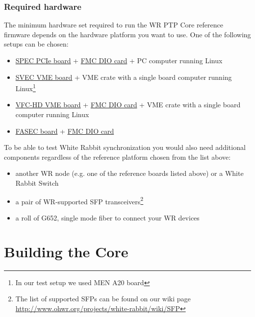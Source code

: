 \documentclass[a4paper, 12pt]{article}
\renewcommand{\_}{\underscore\allowbreak}
\begin{document}
\subsubsection{Required hardware}
\label{Required hardware}

The minimum hardware set required to run the WR PTP Core reference firmware
depends on the hardware platform you want to use. One of the following setups
can be chosen:
\begin{itemize}
\item \href{http://www.ohwr.org/projects/spec}{SPEC PCIe board} +
  \href{http://www.ohwr.org/projects/fmc-dio-5chttla}{FMC DIO card} + PC
  computer running Linux
\item \href{http://www.ohwr.org/projects/svec}{SVEC VME board} + VME crate with
  a single board computer running Linux\footnote{\label{note_a20}In our test setup
    we used MEN A20 board}
\item \href{http://www.ohwr.org/projects/vfc-hd}{VFC-HD VME board} +
  \href{http://www.ohwr.org/projects/fmc-dio-5chttla}{FMC DIO card} +
  VME crate with a single board computer running Linux
\item \href{http://www.ohwr.org/projects/fasec}{FASEC board} +
  \href{http://www.ohwr.org/projects/fmc-dio-5chttla}{FMC DIO card}
\end{itemize}

To be able to test White Rabbit synchronization you would also need
additional components regardless of the reference platform chosen from the list
above:
\begin{itemize}
  \item another WR node (e.g. one of the reference boards listed above) or a
    White Rabbit Switch
  \item a pair of WR-supported SFP transceivers\footnote{The list of supported
    SFPs can be found on our wiki page
    \url{http://www.ohwr.org/projects/white-rabbit/wiki/SFP}}
  \item a roll of G652, single mode fiber to connect your WR devices
\end{itemize}

\newpage
\section{Building the Core}
\label{Building the Core}
\end{document}

